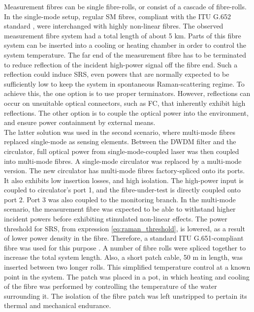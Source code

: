\documentclass{standalone}
\begin{document}
Measurement fibres can be single fibre-rolls, or consist of a cascade of fibre-rolls. In the single-mode setup, regular SM fibres, compliant with the ITU G.652 standard \cite{G652}, were interchanged with highly non-linear fibres. The observed measurement fibre system had a total length of about 5 km. Parts of this fibre system can be inserted into a cooling or heating chamber in order to control the system temperature. The far end of the measurement fibre has to be terminated to reduce reflection of the incident high-power signal off the fibre end. Such a reflection could induce SRS, even powers that are normally expected to be sufficiently low to keep the system in spontaneous Raman-scattering regime. To achieve this, the one option is to use proper terminators. However, reflections can occur on unsuitable optical connectors, such as FC, that inherently exhibit high reflections. The other option is to couple the optical power into the environment, and ensure power containment by external means. \\

The latter solution was used in the second scenario, where multi-mode fibres replaced single-mode as sensing elements. Between the DWDM filter and the circulator, full optical power from single-mode-coupled laser was then coupled into multi-mode fibres. A single-mode circulator was replaced by a multi-mode version. The new circulator has multi-mode fibres factory-spliced onto its ports. It also exhibits low insertion losses, and high isolation. The high-power input is coupled to circulator's port 1, and the fibre-under-test is directly coupled onto port 2. Port 3 was also coupled to the monitoring branch. In the multi-mode scenario, the measurement fibre was expected to be able to withstand higher incident powers before exhibiting stimulated non-linear effects. The power threshold for SRS, from expression \ref{eq:raman_threshold}, is lowered, as a result of lower power density in the fibre. Therefore, a standard ITU G.651-compliant fibre was used for this purpose \cite{G651}. A number of fibre rolls were spliced together to increase the total system length. Also, a short patch cable, 50 m in length, was inserted between two longer rolls. This simplified temperature control at a known point in the system. The patch was placed in a pot, in which heating and cooling of the fibre was performed by controlling the temperature of the water surrounding it. The isolation of the fibre patch was left unstripped to pertain its thermal and mechanical endurance. \\
\end{document}
